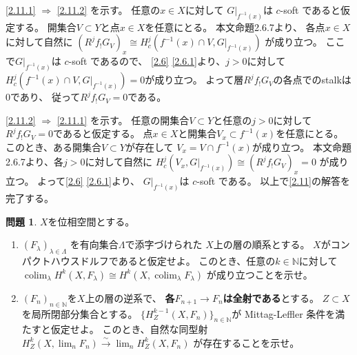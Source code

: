 \documentclass[uplatex,dvipdfmx]{jsarticle}
\makeatletter
\theoremstyle{definition}
\newtheorem{prob}[prob]{問題}
\renewenvironment{proof}[1][\proofname]{
  \pushQED{\qed}%
  \normalfont \topsep6\p@\@plus6\p@\relax
  \trivlist
  \item[\hskip\labelsep
    #1\@addpunct{\textbf{.}}]\ignorespaces
}{%
  \popQED\endtrivlist\@endpefalse
}
\providecommand{\proofname}{証明}
\DeclareMathOperator{\colim}{\mathrm{colim}}
\newcommand\N{\mathbb{N}}
\makeatother
\begin{document}
\begin{proof}
  \ref{2.11.1} \(\Rightarrow\) \ref{2.11.2}
  を示す。
  任意の\(x\in X\)に対して
  \(G|_{f^{-1}(x)}\)は \(c\)-soft であると仮定する。
  開集合\(V\subset Y\)と点\(x\in X\)を任意にとる。
  本文命題2.6.7より、
  各点\(x\in X\)に対して自然に
  \((R^jf_!G_V)_x \cong H^j_c(f^{-1}(x)\cap V,G|_{f^{-1}(x)})\)
  が成り立つ。
  ここで\(G|_{f^{-1}(x)}\)は \(c\)-soft であるので、
  \autoref{2.6} \ref{2.6.1}より、\(j>0\)に対して
  \(H^j_c(f^{-1}(x)\cap V,G|_{f^{-1}(x)})=0\)が成り立つ。
  よって層\(R^jf_!G_V\)の各点でのstalkは\(0\)であり、
  従って\(R^jf_!G_V=0\)である。

  \ref{2.11.2} \(\Rightarrow\) \ref{2.11.1}
  を示す。
  任意の開集合\(V\subset Y\)と任意の\(j>0\)に対して
  \(R^jf_!G_V=0\)であると仮定する。
  点\(x\in X\)と開集合\(V_x\subset f^{-1}(x)\)を任意にとる。
  このとき、ある開集合\(V\subset Y\)が存在して
  \(V_x = V\cap f^{-1}(x)\)が成り立つ。
  本文命題2.6.7より、各\(j>0\)に対して自然に
  \(H^j_c(V_x,G|_{f^{-1}(x)}) \cong (R^jf_!G_V)_x = 0\)
  が成り立つ。
  よって\autoref{2.6} \ref{2.6.1}より、
  \(G|_{f^{-1}(x)}\)は \(c\)-soft である。
  以上で\autoref{2.11}の解答を完了する。
\end{proof}










\begin{prob}\label{2.12}
  \(X\)を位相空間とする。
  \begin{enumerate}
    \item \label{2.12.1}
    \((F_{\lambda})_{\lambda\in \Lambda}\)
    を有向集合\(\Lambda\)で添字づけられた
    \(X\)上の層の順系とする。
    \(X\)がコンパクトハウスドルフであると仮定せよ。
    このとき、任意の\(k\in \N\)に対して
    \(\colim_{\lambda}H^k(X,F_{\lambda}) \cong
    H^k(X,\colim_{\lambda}F_{\lambda})\)
    が成り立つことを示せ。
    \item \label{2.12.2}
    \((F_n)_{n\in \N}\)を\(X\)上の層の逆系で、
    \textbf{各\(F_{n+1}\to F_n\)は全射である}とする。
    \(Z\subset X\)を局所閉部分集合とする。
    \(\{H^{k-1}_Z(X,F_n)\}_{n\in \N}\)が Mittag-Leffler 条件を満たすと仮定せよ。
    このとき、自然な同型射
    \(H^k_Z(X,\lim_nF_n)\xrightarrow{\sim} \lim_nH^k_Z(X,F_n)\)
    が存在することを示せ。
  \end{enumerate}
\end{prob}
\end{document}
